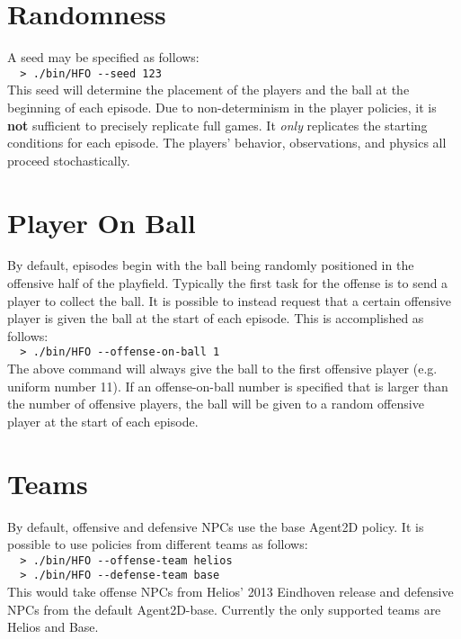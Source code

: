 \documentclass[12pt]{article}
\begin{document}
\section{Randomness}
A seed may be specified as follows:\\

\noindent \verb+  > ./bin/HFO --seed 123+\\

This seed will determine the placement of the players and the ball at
the beginning of each episode. Due to non-determinism in the player
policies, it is \textbf{not} sufficient to precisely replicate full games. It
\textit{only} replicates the starting conditions for each episode. The
players' behavior, observations, and physics all proceed
stochastically.

\section{Player On Ball}
By default, episodes begin with the ball being randomly positioned in
the offensive half of the playfield. Typically the first task for the
offense is to send a player to collect the ball. It is possible to
instead request that a certain offensive player is given the ball at
the start of each episode. This is accomplished as follows:\\

\noindent \verb+  > ./bin/HFO --offense-on-ball 1+\\

The above command will always give the ball to the first offensive
player (e.g. uniform number 11). If an offense-on-ball number is
specified that is larger than the number of offensive players, the
ball will be given to a random offensive player at the start of each
episode.

\section{Teams}
By default, offensive and defensive NPCs use the base Agent2D
policy. It is possible to use policies from different teams as
follows:\\

\noindent \verb+  > ./bin/HFO --offense-team helios+\\
\noindent \verb+  > ./bin/HFO --defense-team base+\\

This would take offense NPCs from Helios' 2013 Eindhoven release and
defensive NPCs from the default Agent2D-base. Currently the only
supported teams are Helios and Base.
\end{document}
